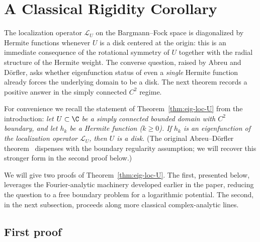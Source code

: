 \section{A Classical Rigidity Corollary}\label{sec:classical-rigidity}

The localization operator $\mathcal{L}_U$ on the Bargmann--Fock space is
diagonalized by Hermite functions whenever $U$ is a disk centered at the
origin: this is an immediate consequence of the rotational symmetry of $U$
together with the radial structure of the Hermite weight. The converse
question, raised by Abreu and D\"orfler, asks whether eigenfunction status of
even a \emph{single} Hermite function already forces the underlying domain to
be a disk. The next theorem records a positive answer in the simply connected
$C^2$ regime.

For convenience we recall the statement of Theorem~\ref{thm:eig-loc-U} from the introduction:
\emph{let $U\subset \C$ be a simply connected bounded domain with $C^2$
boundary, and let $h_k$ be a Hermite function ($k\ge 0$). If $h_k$ is an
eigenfunction of the localization operator $\mathcal{L}_U$, then $U$ is a
disk.} (The original Abreu--D\"orfler theorem~\cite{Abreu-Doerfler} dispenses
with the boundary regularity assumption; we will recover this stronger form
in the second proof below.)

We will give two proofs of Theorem~\ref{thm:eig-loc-U}. The first, presented
below, leverages the Fourier-analytic machinery developed earlier in the
paper, reducing the question to a free boundary problem for a logarithmic
potential. The second, in the next subsection, proceeds along more
classical complex-analytic lines.

\subsection{First proof}


